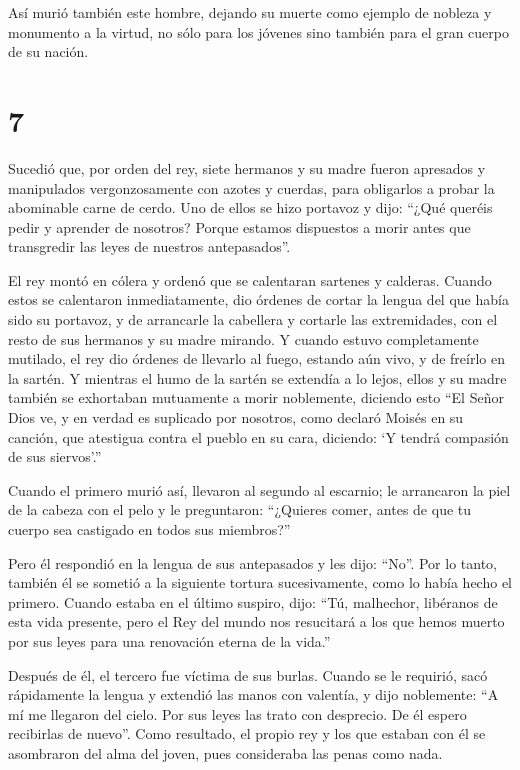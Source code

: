 Así murió también este hombre, dejando su muerte como
ejemplo de nobleza y monumento a la virtud, no sólo para los jóvenes
sino también para el gran cuerpo de su nación.

\hypertarget{section-6}{%
\section{7}\label{section-6}}

 Sucedió que, por orden del rey, siete hermanos y su madre
fueron apresados y manipulados vergonzosamente con azotes y cuerdas,
para obligarlos a probar la abominable carne de cerdo. 
Uno de ellos se hizo portavoz y dijo: ``¿Qué queréis pedir y aprender de
nosotros? Porque estamos dispuestos a morir antes que transgredir las
leyes de nuestros antepasados''.

 El rey montó en cólera y ordenó que se calentaran
sartenes y calderas.  Cuando estos se calentaron
inmediatamente, dio órdenes de cortar la lengua del que había sido su
portavoz, y de arrancarle la cabellera y cortarle las extremidades, con
el resto de sus hermanos y su madre mirando.  Y cuando
estuvo completamente mutilado, el rey dio órdenes de llevarlo al fuego,
estando aún vivo, y de freírlo en la sartén. Y mientras el humo de la
sartén se extendía a lo lejos, ellos y su madre también se exhortaban
mutuamente a morir noblemente, diciendo esto  ``El Señor
Dios ve, y en verdad es suplicado por nosotros, como declaró Moisés en
su canción, que atestigua contra el pueblo en su cara, diciendo: `Y
tendrá compasión de sus siervos'.''

 Cuando el primero murió así, llevaron al segundo al
escarnio; le arrancaron la piel de la cabeza con el pelo y le
preguntaron: ``¿Quieres comer, antes de que tu cuerpo sea castigado en
todos sus miembros?''

 Pero él respondió en la lengua de sus antepasados y les
dijo: ``No''. Por lo tanto, también él se sometió a la siguiente tortura
sucesivamente, como lo había hecho el primero.  Cuando
estaba en el último suspiro, dijo: ``Tú, malhechor, libéranos de esta
vida presente, pero el Rey del mundo nos resucitará a los que hemos
muerto por sus leyes para una renovación eterna de la vida.''

 Después de él, el tercero fue víctima de sus burlas.
Cuando se le requirió, sacó rápidamente la lengua y extendió las manos
con valentía,  y dijo noblemente: ``A mí me llegaron del
cielo. Por sus leyes las trato con desprecio. De él espero recibirlas de
nuevo''.  Como resultado, el propio rey y los que estaban
con él se asombraron del alma del joven, pues consideraba las penas como
nada.

